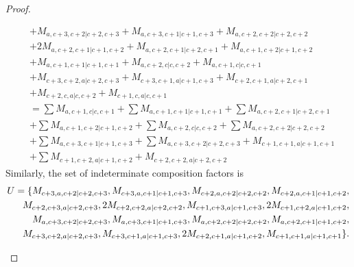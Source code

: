 \begin{proof}
\begin{enumerate}
\begin{enumerate}
\begin{equation}
\begin{aligned}
                                              &
+ M_{a,c+3,c+2|c+2,c+3}
+ M_{a,c+3,c+1|c+1,c+3}
+ M_{a,c+2,c+2|c+2,c+2}\\
                                              &
+ 2M_{a,c+2,c+1|c+1,c+2}
+ M_{a,c+2,c+1|c+2,c+1}
+ M_{a,c+1,c+2|c+1,c+2}\\
                                              &
+ M_{a,c+1,c+1|c+1,c+1}
+ M_{a,c+2,c|c,c+2}
+ M_{a,c+1,c|c,c+1}\\
                                              &
+ M_{c+3,c+2,a|c+2,c+3}
+ M_{c+3,c+1,a|c+1,c+3}
+ M_{c+2,c+1,a|c+2,c+1}\\
                                              &
+ M_{c+2,c,a|c,c+2}
+ M_{c+1,c,a|c,c+1} \\
                                               &=
\sum M_{a,c+1,c|c,c+1}
+ \sum M_{a,c+1,c+1|c+1,c+1}
+ \sum M_{a,c+2,c+1|c+2,c+1}\\
                                              &
+ \sum M_{a,c+1,c+2|c+1,c+2}
+ \sum M_{a,c+2,c|c,c+2}
+ \sum M_{a,c+2,c+2|c+2,c+2}\\
                                              &
+ \sum M_{a,c+3,c+1|c+1,c+3}
+ \sum M_{a,c+3,c+2|c+2,c+3}
+  M_{c+1,c+1,a|c+1,c+1}\\
                                              &
+ \sum M_{c+1,c+2,a|c+1,c+2}
+  M_{c+2,c+2,a|c+2,c+2}
          \end{aligned}
        \end{equation}
      Similarly, the set of indeterminate composition factors is 
\begin{equation}\notag
  \begin{aligned}
    U = \{
M_{c+3,a,c+2|c+2,c+3},
M_{c+3,a,c+1|c+1,c+3},
M_{c+2,a,c+2|c+2,c+2},
M_{c+2,a,c+1|c+1,c+2},\\
M_{c+2,c+3,a|c+2,c+3},
2M_{c+2,c+2,a|c+2,c+2},
M_{c+1,c+3,a|c+1,c+3},
2M_{c+1,c+2,a|c+1,c+2},\\
M_{a,c+3,c+2|c+2,c+3},
M_{a,c+3,c+1|c+1,c+3},
M_{a,c+2,c+2|c+2,c+2},
M_{a,c+2,c+1|c+1,c+2},\\
M_{c+3,c+2,a|c+2,c+3},
M_{c+3,c+1,a|c+1,c+3},
2M_{c+2,c+1,a|c+1,c+2},
M_{c+1,c+1,a|c+1,c+1}
\}. 
  \end{aligned}
\end{equation}
      

\end{enumerate}
\end{enumerate}
\end{proof}
